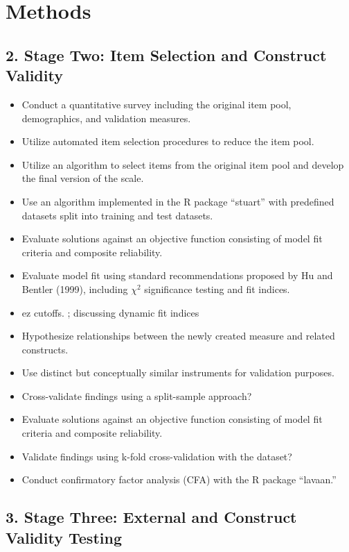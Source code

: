 \documentclass[
  12pt,
  a4paper,
  twoside]{article}
\providecommand{\tightlist}{%
  \setlength{\itemsep}{0pt}\setlength{\parskip}{0pt}}
\begin{document}
\section{Methods}\label{methods}

\subsection{2. Stage Two: Item Selection and Construct Validity}\label{stage-two-item-selection-and-construct-validity}

\begin{itemize}
\tightlist
\item
  Conduct a quantitative survey including the original item pool, demographics, and validation measures.
\item
  Utilize automated item selection procedures to reduce the item pool.
\item
  Utilize an algorithm to select items from the original item pool and develop the final version of the scale.
\item
  Use an algorithm implemented in the R package ``stuart'' with predefined datasets split into training and test datasets.
\item
  Evaluate solutions against an objective function consisting of model fit criteria and composite reliability.
\item
  Evaluate model fit using standard recommendations proposed by Hu and Bentler (1999), including \(\chi^2\) significance testing and fit indices.
\item
  ez cutoffs. ; discussing dynamic fit indices
\item
  Hypothesize relationships between the newly created measure and related constructs.
\item
  Use distinct but conceptually similar instruments for validation purposes.
\item
  Cross-validate findings using a split-sample approach?
\item
  Evaluate solutions against an objective function consisting of model fit criteria and composite reliability.
\item
  Validate findings using k-fold cross-validation with the dataset?
\item
  Conduct confirmatory factor analysis (CFA) with the R package ``lavaan.''
\end{itemize}

\subsection{3. Stage Three: External and Construct Validity Testing}\label{stage-three-external-and-construct-validity-testing}
\end{document}
